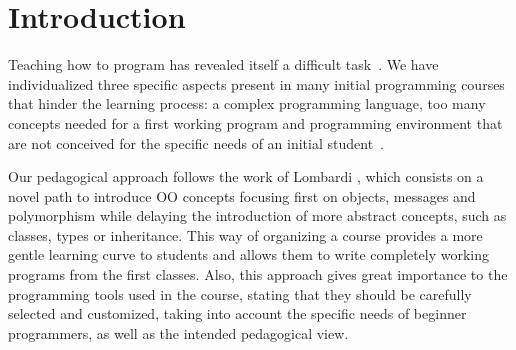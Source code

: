 \section{Introduction}
\label{sec:intro}



Teaching how to program has revealed itself a difficult task~\cite{dijkstra_89a, jenkins2002difficulty}.
We have individualized three specific aspects present in many initial programming courses that hinder  the learning process: 
a complex programming language,
too many concepts needed for a first working program and
programming environment that are not conceived for the specific needs of an initial student~\cite{singh2012}.



\medskip 



\medskip

Our pedagogical approach follows the work of Lombardi \etal
\cite{lombardi_instances_2007,lombardi_carlos_alumnos_2008,griggio_programming_2011,spigariol_lucas_ensenando_2013,passerini2017wollok}, 
which consists on a novel path to introduce OO concepts focusing first on objects, messages and polymorphism 
while delaying the introduction of more abstract concepts,
such as classes, types or inheritance.
This way of organizing a course provides a more gentle learning curve to students and allows them to write completely working programs from the first classes.
Also, this approach gives great importance to the programming tools used in the course, 
stating that they should be carefully selected and customized, 
taking into account the specific needs of beginner programmers,
as well as the intended pedagogical view.

